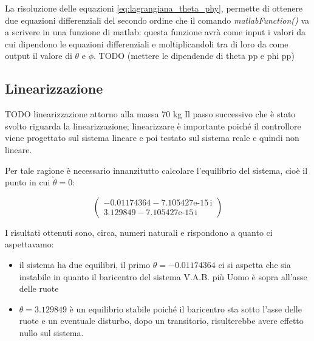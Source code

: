 La risoluzione delle equazioni \ref{eq:lagrangiana_theta_phy}, permette di ottenere due equazioni differenziali del secondo ordine che il comando \textit{matlabFunction()} va a scrivere in una funzione di matlab: questa funzione avrà come input i valori da cui dipendono le equazioni differenziali e moltiplicandoli tra di loro da come output il valore di $\ddot{\theta}$ e $\ddot{\phi}$.
TODO (mettere le dipendende di theta pp e phi pp)

\subsection{Linearizzazione} TODO linearizzazione attorno alla massa 70 kg
Il passo successivo che è stato svolto riguarda la linearizzazione; linearizzare è importante poiché il controllore viene progettato sul sistema lineare e poi testato sul sistema reale e quindi non lineare.

Per tale ragione è necessario innanzitutto calcolare l'equilibrio del sistema, cioè il punto in cui $\ddot{\theta} = 0$:
\begin{center}
	$$\left(\begin{array}{c}
		-0.01174364-\text{7.105427e-15}\,\mathrm{i}\\
		3.129849-\text{7.105427e-15}\,\mathrm{i}
	\end{array}\right)$$
\end{center}

I risultati ottenuti sono, circa, numeri naturali e rispondono a quanto ci aspettavamo: 
\begin{itemize}
	\item il sistema ha due equilibri, il primo $\theta = -0.01174364$ ci si aspetta che sia instabile in quanto il baricentro del sistema V.A.B. più Uomo è sopra all'asse delle ruote
	\item  $\theta = 3.129849$ è un equilibrio stabile poiché il baricentro sta sotto l'asse delle ruote e un eventuale disturbo, dopo un transitorio, risulterebbe avere effetto nullo sul sistema.
\end{itemize}

